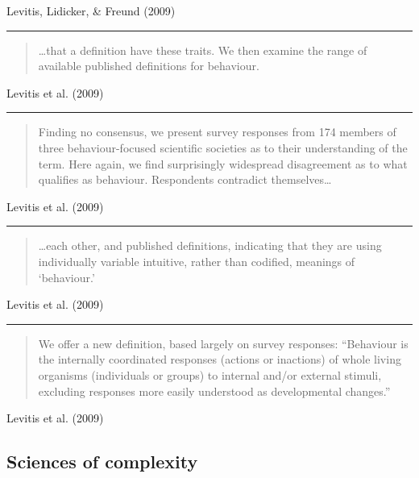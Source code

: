 \documentclass[
  letterpaper,
  DIV=11,
  numbers=noendperiod]{scrartcl}
\begin{document}
Levitis, Lidicker, \& Freund (2009)

\begin{center}\rule{0.5\linewidth}{0.5pt}\end{center}

\begin{quote}
\ldots that a definition have these traits. We then examine the range of
available published definitions for behaviour.
\end{quote}

Levitis et al. (2009)

\begin{center}\rule{0.5\linewidth}{0.5pt}\end{center}

\begin{quote}
Finding no consensus, we present survey responses from 174 members of
three behaviour-focused scientific societies as to their understanding
of the term. Here again, we find surprisingly widespread disagreement as
to what qualifies as behaviour. Respondents contradict
themselves\ldots{}
\end{quote}

Levitis et al. (2009)

\begin{center}\rule{0.5\linewidth}{0.5pt}\end{center}

\begin{quote}
\ldots each other, and published definitions, indicating that they are
using individually variable intuitive, rather than codified, meanings of
`behaviour.'
\end{quote}

Levitis et al. (2009)

\begin{center}\rule{0.5\linewidth}{0.5pt}\end{center}

\begin{quote}
We offer a new definition, based largely on survey responses:
``Behaviour is the internally coordinated responses (actions or
inactions) of whole living organisms (individuals or groups) to internal
and/or external stimuli, excluding responses more easily understood as
developmental changes.''
\end{quote}

Levitis et al. (2009)

\subsection{Sciences of complexity}\label{sciences-of-complexity}
\end{document}
